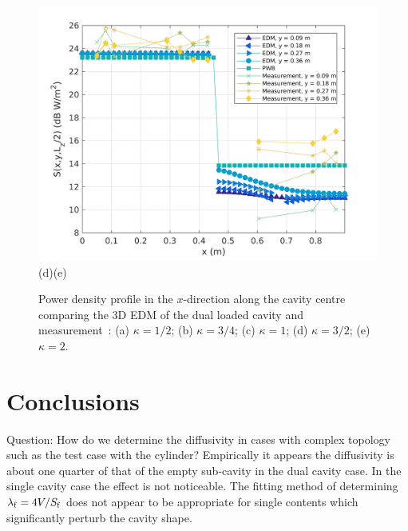 \documentclass[a4paper]{article}
\numberwithin{equation}{section}
\begin{document}
\begin{figure}[ht]
\begin{center}
\includegraphics[width=0.49\linewidth]{figures/DDM-EEBC_3D_DL_PowerDensityProfileXMeas_JX_k2_0}\\
{\footnotesize (d)\hspace{75mm}(e)}\\
\vspace{-2mm}
\caption{\label{fg:measprofsdlk} Power density profile in the $x$-direction along the cavity centre comparing
the 3D EDM of the dual loaded cavity and measurement~\citep{Flintoft2017b}: (a) $\kappa=1/2$; (b) $\kappa=3/4$;
(c) $\kappa=1$; (d) $\kappa=3/2$; (e) $\kappa=2$.}
\end{center}
\end{figure}

\section[Conclusions]{Conclusions}
\label{sc:conc}

{\color{red} Question: How do we determine the diffusivity in cases with complex topology such as
the test case with the cylinder? Empirically it appears the diffusivity is about one quarter of that
of the empty sub-cavity in the dual cavity case. In the single cavity case the effect is not
noticeable. The fitting method of determining $\lambda_{\mathrm{f}} = 4V/S_{\mathrm{f}}$ does not appear to be
appropriate for single contents which significantly perturb the cavity shape.}


%

\end{document}
